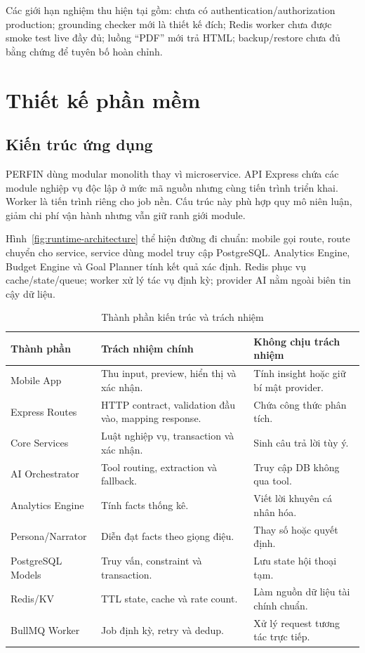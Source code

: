 Các giới hạn nghiệm thu hiện tại gồm: chưa có authentication/authorization production; grounding checker mới là thiết kế đích; Redis worker chưa được smoke test live đầy đủ; luồng ``PDF'' mới trả HTML; backup/restore chưa đủ bằng chứng để tuyên bố hoàn chỉnh.

\section{Thiết kế phần mềm}

\subsection{Kiến trúc ứng dụng}

PERFIN dùng modular monolith thay vì microservice. API Express chứa các module nghiệp vụ độc lập ở mức mã nguồn nhưng cùng tiến trình triển khai. Worker là tiến trình riêng cho job nền. Cấu trúc này phù hợp quy mô niên luận, giảm chi phí vận hành nhưng vẫn giữ ranh giới module.


Hình~\ref{fig:runtime-architecture} thể hiện đường đi chuẩn: mobile gọi route, route chuyển cho service, service dùng model truy cập PostgreSQL. Analytics Engine, Budget Engine và Goal Planner tính kết quả xác định. Redis phục vụ cache/state/queue; worker xử lý tác vụ định kỳ; provider AI nằm ngoài biên tin cậy dữ liệu.

\begin{table}[H]
  \centering
  \caption{Thành phần kiến trúc và trách nhiệm}
  \label{tab:components}
  \begin{tabularx}{\textwidth}{@{}L{3.4cm}Y Y@{}}
    \toprule
    \textbf{Thành phần} & \textbf{Trách nhiệm chính} & \textbf{Không chịu trách nhiệm} \\
    \midrule
    Mobile App & Thu input, preview, hiển thị và xác nhận. & Tính insight hoặc giữ bí mật provider. \\
    Express Routes & HTTP contract, validation đầu vào, mapping response. & Chứa công thức phân tích. \\
    Core Services & Luật nghiệp vụ, transaction và xác nhận. & Sinh câu trả lời tùy ý. \\
    AI Orchestrator & Tool routing, extraction và fallback. & Truy cập DB không qua tool. \\
    Analytics Engine & Tính facts thống kê. & Viết lời khuyên cá nhân hóa. \\
    Persona/Narrator & Diễn đạt facts theo giọng điệu. & Thay số hoặc quyết định. \\
    PostgreSQL Models & Truy vấn, constraint và transaction. & Lưu state hội thoại tạm. \\
    Redis/KV & TTL state, cache và rate count. & Làm nguồn dữ liệu tài chính chuẩn. \\
    BullMQ Worker & Job định kỳ, retry và dedup. & Xử lý request tương tác trực tiếp. \\
    \bottomrule
  \end{tabularx}
\end{table}

